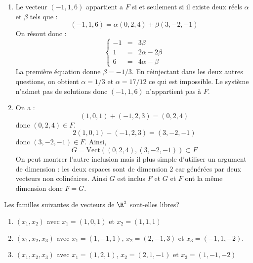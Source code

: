 \documentclass[a4paper,twoside,french,11pt]{VcCours}
\begin{document}
\corr 
\begin{enumerate}
\item Le vecteur $(-1,1,6)$ appartient a $F$ si et seulement si il existe deux réels $\alpha$ et $\beta$ tels que :
$$ (-1,1,6) = \alpha (0,2,4) + \beta (3,-2,-1)$$
On résout donc :
$$ \left\lbrace \begin{array}{ccl}
-1 & = & 3 \beta \\
1 & = & 2 \alpha - 2 \beta \\
6 & = & 4 \alpha - \beta
\end{array}\right.$$
La première équation donne $\beta = -1/3$. En réinjectant dans les deux autres questions, on obtient $\alpha=1/3$ et $\alpha = 17/12$ ce qui est impossible. Le système n'admet pas de solutions donc $(-1,1,6)$ n'appartient pas à $F$.
\item On a :
$$ (1,0,1) + (-1,2,3) =(0,2,4)$$
donc $(0,2,4) \in F$.
$$ 2(1,0,1) -(-1,2,3) = (3,-2,-1)$$
donc $(3,-2,-1) \in F$. Ainsi,
$$ G=\textrm{Vect}((0,2,4), (3,-2,-1)) \subset F$$
On peut montrer l'autre inclusion mais il plus simple d'utiliser un argument de dimension : les deux espaces sont de dimension $2$ car générées par deux vecteurs non colinéaires. Ainsi $G$ est inclus $F$ et $G$ et $F$ ont la même dimension donc $F=G$.
\end{enumerate}

\begin{Exercice}{} Les familles suivantes de vecteurs de $\R^3$ sont-elles libres?
   \begin{enumerate}
  \item
        $(x_1 ,x_2)$ avec $x_1 = (1,0,1)$ et $x_2 = (1,1,1)$
      \item
        $(x_1 ,x_2 ,x_3)$ avec $x_1 = (1, - 1,1)$, $x_2 = (2, - 1,3)$ et $x_3 = ( - 1,1, - 2)$.
      \item
        $(x_1 ,x_2 ,x_3)$ avec $x_1 = (1,2,1)$, $x_2 = (2,1, - 1)$ et $x_3 = (1, - 1, - 2)$
    \end{enumerate}
\end{Exercice}

\corr
\end{document}
